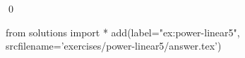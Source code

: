 
\begin{ex} 
  \label{ex:power-linear5}
  
  \qed
\end{ex} 
\begin{python0}
from solutions import *
add(label="ex:power-linear5",
    srcfilename='exercises/power-linear5/answer.tex') 
\end{python0}
